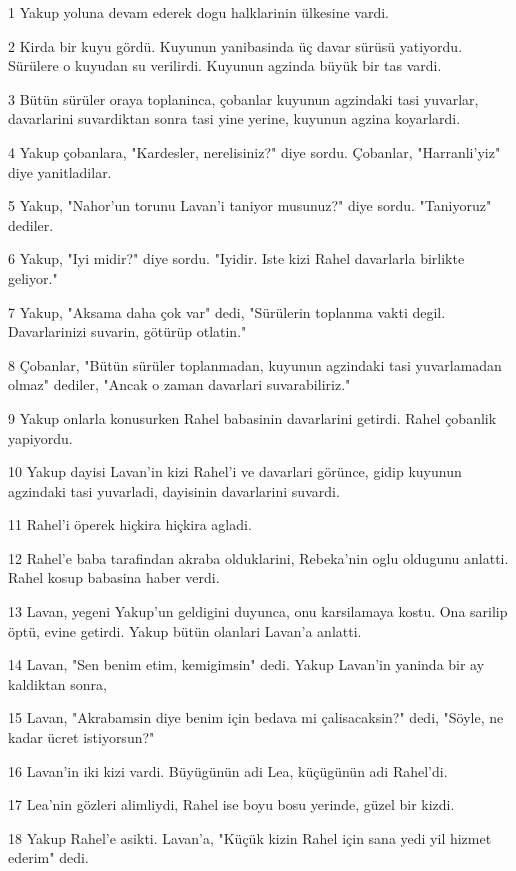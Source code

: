 \par 1 Yakup yoluna devam ederek dogu halklarinin ülkesine vardi.
\par 2 Kirda bir kuyu gördü. Kuyunun yanibasinda üç davar sürüsü yatiyordu. Sürülere o kuyudan su verilirdi. Kuyunun agzinda büyük bir tas vardi.
\par 3 Bütün sürüler oraya toplaninca, çobanlar kuyunun agzindaki tasi yuvarlar, davarlarini suvardiktan sonra tasi yine yerine, kuyunun agzina koyarlardi.
\par 4 Yakup çobanlara, "Kardesler, nerelisiniz?" diye sordu. Çobanlar, "Harranli'yiz" diye yanitladilar.
\par 5 Yakup, "Nahor'un torunu Lavan'i taniyor musunuz?" diye sordu. "Taniyoruz" dediler.
\par 6 Yakup, "Iyi midir?" diye sordu. "Iyidir. Iste kizi Rahel davarlarla birlikte geliyor."
\par 7 Yakup, "Aksama daha çok var" dedi, "Sürülerin toplanma vakti degil. Davarlarinizi suvarin, götürüp otlatin."
\par 8 Çobanlar, "Bütün sürüler toplanmadan, kuyunun agzindaki tasi yuvarlamadan olmaz" dediler, "Ancak o zaman davarlari suvarabiliriz."
\par 9 Yakup onlarla konusurken Rahel babasinin davarlarini getirdi. Rahel çobanlik yapiyordu.
\par 10 Yakup dayisi Lavan'in kizi Rahel'i ve davarlari görünce, gidip kuyunun agzindaki tasi yuvarladi, dayisinin davarlarini suvardi.
\par 11 Rahel'i öperek hiçkira hiçkira agladi.
\par 12 Rahel'e baba tarafindan akraba olduklarini, Rebeka'nin oglu oldugunu anlatti. Rahel kosup babasina haber verdi.
\par 13 Lavan, yegeni Yakup'un geldigini duyunca, onu karsilamaya kostu. Ona sarilip öptü, evine getirdi. Yakup bütün olanlari Lavan'a anlatti.
\par 14 Lavan, "Sen benim etim, kemigimsin" dedi. Yakup Lavan'in yaninda bir ay kaldiktan sonra,
\par 15 Lavan, "Akrabamsin diye benim için bedava mi çalisacaksin?" dedi, "Söyle, ne kadar ücret istiyorsun?"
\par 16 Lavan'in iki kizi vardi. Büyügünün adi Lea, küçügünün adi Rahel'di.
\par 17 Lea'nin gözleri alimliydi, Rahel ise boyu bosu yerinde, güzel bir kizdi.
\par 18 Yakup Rahel'e asikti. Lavan'a, "Küçük kizin Rahel için sana yedi yil hizmet ederim" dedi.
